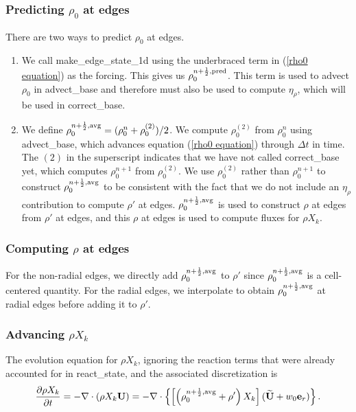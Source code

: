 \documentclass[11pt]{article}
\def\half  {\frac{1}{2}}
\def\eb    {{\bf e}}
\def\Ub    {{\bf U}}
\def\Ubt   {\widetilde{\bf U}}
\begin{document}
\subsubsection{Predicting $\rho_0$ at edges}\label{Predicting rho0 at edges}
There are two ways to predict $\rho_0$ at edges.
\begin{enumerate}
\item We call make\_edge\_state\_1d using the underbraced term in 
(\ref{rho0 equation}) as the forcing.  This gives us $\rho_0^{n+\half,{\rm pred}}$.
This term is used to advect $\rho_0$ in advect\_base and therefore must also be used 
to compute $\eta_\rho$, which will be used in correct\_base.
\item We define $\rho_0^{n+\half,{\rm avg}} = (\rho_0^n + \rho_0^{(2)})/2$.  We 
compute $\rho_0^{(2)}$ from $\rho_0^n$ using advect\_base, which advances equation 
(\ref{rho0 equation}) through $\Delta t$ in time.  The $(2)$ in the superscript indicates 
that we have not called correct\_base yet, which computes  $\rho_0^{n+1}$ from $\rho_0^{(2)}$. 
We use $\rho_0^{(2)}$ rather than $\rho_0^{n+1}$ to construct $\rho_0^{n+\half,{\rm avg}}$ to be 
consistent with the fact that we do not include an $\eta_\rho$ contribution to compute 
$\rho'$ at edges.  $\rho_0^{n+\half,{\rm avg}}$ is used to construct $\rho$ at edges from 
$\rho'$ at edges, and this $\rho$ at edges is used to compute fluxes for $\rho X_k$.  
\end{enumerate}
\subsubsection{Computing $\rho$ at edges}\label{Computing rho at edges}
For the non-radial edges, we directly add $\rho_0^{n+\half,{\rm avg}}$ to $\rho'$ since 
$\rho_0^{n+\half,{\rm avg}}$ is a cell-centered quantity.  For the radial edges, we 
interpolate to obtain $\rho_0^{n+\half,{\rm avg}}$ at radial edges before adding it to $\rho'$.
\subsubsection{Advancing $\rho X_k$}\label{Advancing rhoX_k}
The evolution equation for $\rho X_k$, ignoring the reaction terms that were already 
accounted for in react\_state, and the associated discretization is
\begin{equation}
\frac{\partial\rho X_k}{\partial t} = -\nabla\cdot(\rho X_k\Ub) = 
-\nabla\cdot\left\{\left[\left(\rho_0^{n+\half,{\rm avg}} 
+ \rho'\right)X_k\right](\Ubt+w_0\eb_r)\right\}.
\end{equation}
\end{document}
